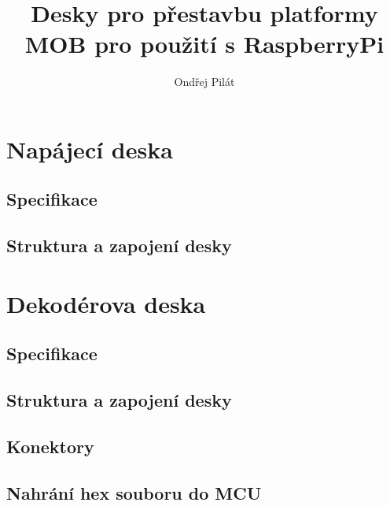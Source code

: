 \documentclass[a4paper,11pt]{article}
\author{Ondřej Pilát}
\title{Desky pro přestavbu platformy MOB pro použití s RaspberryPi}
\begin{document}
\maketitle
\newpage
\tableofcontents
\newpage
\section{Napájecí deska}
\subsection{Specifikace}
\subsection{Struktura a zapojení desky}
\section{Dekodérova deska}
\subsection{Specifikace}
\subsection{Struktura a zapojení desky}
\subsection{Konektory}
\subsection{Nahrání hex souboru do MCU}
\end{document}
